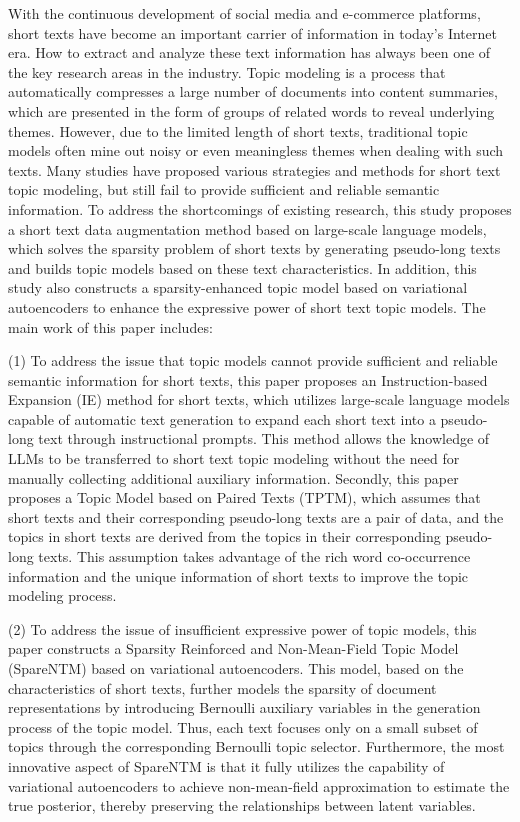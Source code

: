\begin{ABSTRACT}
With the continuous development of social media and e-commerce platforms, short texts have become an important carrier of information in today's Internet era. How to extract and analyze these text information has always been one of the key research areas in the industry. Topic modeling is a process that automatically compresses a large number of documents into content summaries, which are presented in the form of groups of related words to reveal underlying themes. However, due to the limited length of short texts, traditional topic models often mine out noisy or even meaningless themes when dealing with such texts. Many studies have proposed various strategies and methods for short text topic modeling, but still fail to provide sufficient and reliable semantic information. To address the shortcomings of existing research, this study proposes a short text data augmentation method based on large-scale language models, which solves the sparsity problem of short texts by generating pseudo-long texts and builds topic models based on these text characteristics. In addition, this study also constructs a sparsity-enhanced topic model based on variational autoencoders to enhance the expressive power of short text topic models. The main work of this paper includes:

(1) To address the issue that topic models cannot provide sufficient and reliable semantic information for short texts, this paper proposes an Instruction-based Expansion (IE) method for short texts, which utilizes large-scale language models capable of automatic text generation to expand each short text into a pseudo-long text through instructional prompts. This method allows the knowledge of LLMs to be transferred to short text topic modeling without the need for manually collecting additional auxiliary information. Secondly, this paper proposes a Topic Model based on Paired Texts (TPTM), which assumes that short texts and their corresponding pseudo-long texts are a pair of data, and the topics in short texts are derived from the topics in their corresponding pseudo-long texts. This assumption takes advantage of the rich word co-occurrence information and the unique information of short texts to improve the topic modeling process.
    
(2) To address the issue of insufficient expressive power of topic models, this paper constructs a Sparsity Reinforced and Non-Mean-Field Topic Model (SpareNTM) based on variational autoencoders. This model, based on the characteristics of short texts, further models the sparsity of document representations by introducing Bernoulli auxiliary variables in the generation process of the topic model. Thus, each text focuses only on a small subset of topics through the corresponding Bernoulli topic selector. Furthermore, the most innovative aspect of SpareNTM is that it fully utilizes the capability of variational autoencoders to achieve non-mean-field approximation to estimate the true posterior, thereby preserving the relationships between latent variables.


\end{ABSTRACT}
